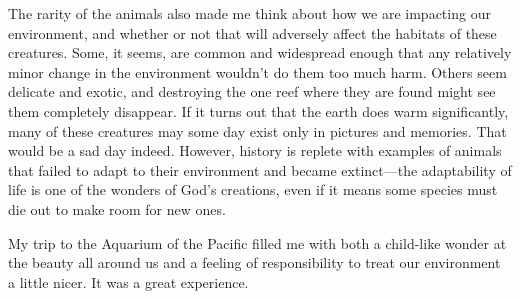 \documentclass[onecolumn, 12pt]{article}
\begin{document}
The rarity of the animals also made me think about how we are impacting our
environment, and whether or not that will adversely affect the habitats of
these creatures.  Some, it seems, are common and widespread enough that any
relatively minor change in the environment wouldn't do them too much harm.
Others seem delicate and exotic, and destroying the one reef where they are
found might see them completely disappear.  If it turns out that the earth does
warm significantly, many of these creatures may some day exist only in pictures
and memories.  That would be a sad day indeed.  However, history is replete
with examples of animals that failed to adapt to their environment and became
extinct---the adaptability of life is one of the wonders of God's creations,
even if it means some species must die out to make room for new ones.

My trip to the Aquarium of the Pacific filled me with both a child-like wonder
at the beauty all around us and a feeling of responsibility to treat our
environment a little nicer.  It was a great experience.
\end{document}
